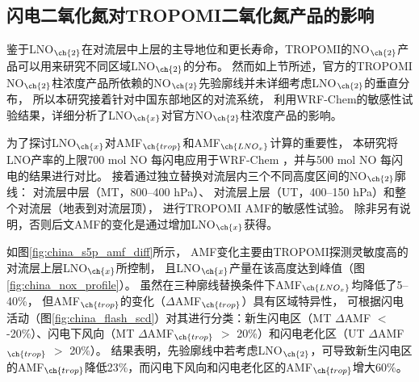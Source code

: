 \subsection{闪电二氧化氮对TROPOMI二氧化氮产品的影响} \label{sec:lno2_affects_tropomi}

鉴于LNO$_{\ch{2}}$在对流层中上层的主导地位和更长寿命，TROPOMI的NO$_{\ch{2}}$产品可以用来研究不同区域LNO$_{\ch{2}}$的分布。
然而如上节所述，官方的TROPOMI NO$_{\ch{2}}$柱浓度产品所依赖的NO$_{\ch{2}}$先验廓线并未详细考虑LNO$_{\ch{2}}$的垂直分布，
所以本研究接着针对中国东部地区的对流系统，
利用WRF-Chem的敏感性试验结果，详细分析了LNO$_{\ch{x}}$对官方NO$_{\ch{2}}$柱浓度产品的影响。

为了探讨LNO$_{\ch{x}}$对AMF$_{\ch{trop}}$和AMF$_{\ch{LNO_x}}$计算的重要性，
本研究将LNO产率的上限700 mol NO 每闪电\citep{Ott.2010}应用于WRF-Chem ，并与500 mol NO 每闪电的结果进行对比。
接着通过独立替换对流层内三个不同高度区间的NO$_{\ch{2}}$廓线：
对流层中层（MT，800--400 hPa）、
对流层上层（UT，400--150 hPa）和整个对流层（地表到对流层顶），
进行TROPOMI AMF的敏感性试验。
除非另有说明，否则后文AMF的变化是通过增加LNO$_{\ch{x}}$获得。

如图\ref{fig:china_s5p_amf_diff}所示，
AMF变化主要由TROPOMI探测灵敏度高的对流层上层LNO$_{\ch{x}}$所控制\citep{Beirle.2009,Laughner.2017}，
且LNO$_{\ch{x}}$产量在该高度达到峰值（图\ref{fig:china_nox_profile}）。
虽然在三种廓线替换条件下AMF$_{\ch{LNO_x}}$均降低了5--40\%，
但AMF$_{\ch{trop}}$的变化（$\Delta$AMF$_{\ch{trop}}$）具有区域特异性，
可根据闪电活动（图\ref{fig:china_flash_scd}）对其进行分类：新生闪电区（MT $\Delta$AMF $<$ -20\%）、闪电下风向（MT $\Delta$AMF$_{\ch{trop}}$ $>$ 20\%）和闪电老化区（UT $\Delta$AMF$_{\ch{trop}}$ $>$ 20\%）。
结果表明，先验廓线中若考虑LNO$_{\ch{2}}$，可导致新生闪电区的AMF$_{\ch{trop}}$降低23\%，而闪电下风向和闪电老化区的AMF$_{\ch{trop}}$增大60\%。

